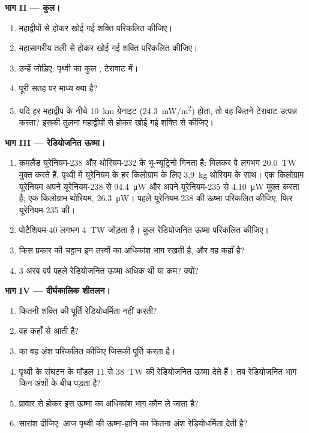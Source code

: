 \begin{problem}
\medskip
\noindent\textbf{भाग II --- कुल।}
\begin{enumerate}[resume]
  \item महाद्वीपों से होकर खोई गई शक्ति परिकलित कीजिए।
  \item महासागरीय तली से होकर खोई गई शक्ति परिकलित कीजिए।
  \item उन्हें जोड़िए: पृथ्वी का कुल , टेरावाट में।
  \item पूरी सतह पर माध्य  क्या है?
  \item यदि हर महाद्वीप के नीचे \qty{10}{km} ग्रेनाइट (\qty{24.3}{mW/m^2}) होता,
        तो वह कितने टेरावाट उत्पन्न करता? इसकी तुलना
        महाद्वीपों से होकर खोई गई शक्ति से कीजिए।
\end{enumerate}

\medskip
\noindent\textbf{भाग III --- रेडियोजनित ऊष्मा।}
\begin{enumerate}[resume]
  \item कमलैंड यूरेनियम-238 और थोरियम-232 के भू-न्यूट्रिनो गिनता है: मिलकर
        वे लगभग \qty{20.0}{TW} मुक्त करते हैं, पृथ्वी में यूरेनियम के हर किलोग्राम के लिए
        \qty{3.9}{kg} थोरियम के साथ। एक किलोग्राम यूरेनियम अपने यूरेनियम-238 से
        \qty{94.4}{\micro W} और अपने यूरेनियम-235 से \qty{4.10}{\micro W}
        मुक्त करता है; एक किलोग्राम थोरियम, \qty{26.3}{\micro W}।
        पहले यूरेनियम-238 की ऊष्मा परिकलित कीजिए, फिर यूरेनियम-235 की।
  \item पोटैशियम-40 लगभग \qty{4}{TW} जोड़ता है। कुल रेडियोजनित ऊष्मा परिकलित कीजिए।
  \item किस प्रकार की चट्टान इन तत्त्वों का अधिकांश भाग रखती है, और वह कहाँ है?
  \item 3 अरब वर्ष पहले रेडियोजनित ऊष्मा अधिक थी या कम? क्यों?
\end{enumerate}

\medskip
\noindent\textbf{भाग IV --- दीर्घकालिक शीतलन।}
\begin{enumerate}[resume]
  \item कितनी शक्ति की पूर्ति रेडियोधर्मिता नहीं करती?
  \item वह कहाँ से आती है?
  \item {} का वह अंश परिकलित कीजिए जिसकी पूर्ति  करता है।
  \item पृथ्वी के संघटन के मॉडल 11 से
        \qty{38}{TW} की रेडियोजनित ऊष्मा देते हैं।
        तब रेडियोजनित भाग किन अंशों के बीच पड़ता है?
  \item प्रावार से होकर इस ऊष्मा का अधिकांश भाग कौन ले जाता है?
  \item सारांश दीजिए: आज पृथ्वी की ऊष्मा-हानि का कितना अंश रेडियोधर्मिता
        देती है?
\end{enumerate}
\end{problem}
